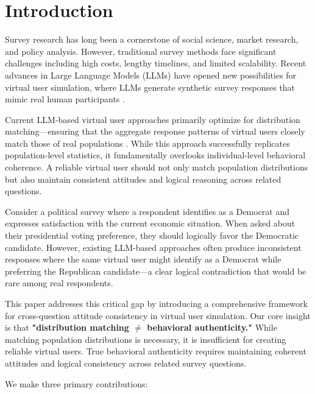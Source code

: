 \documentclass[sigconf, anonymous]{acmart}
\begin{document}
\section{Introduction}

Survey research has long been a cornerstone of social science, market research, and policy analysis. However, traditional survey methods face significant challenges including high costs, lengthy timelines, and limited scalability. Recent advances in Large Language Models (LLMs) have opened new possibilities for virtual user simulation, where LLMs generate synthetic survey responses that mimic real human participants \cite{park2023generative, chen2025polypersona, wang2025large}.

Current LLM-based virtual user approaches primarily optimize for distribution matching—ensuring that the aggregate response patterns of virtual users closely match those of real populations \cite{zhang2025llm, liu2025alignsurvey}. While this approach successfully replicates population-level statistics, it fundamentally overlooks individual-level behavioral coherence. A reliable virtual user should not only match population distributions but also maintain consistent attitudes and logical reasoning across related questions.

Consider a political survey where a respondent identifies as a Democrat and expresses satisfaction with the current economic situation. When asked about their presidential voting preference, they should logically favor the Democratic candidate. However, existing LLM-based approaches often produce inconsistent responses where the same virtual user might identify as a Democrat while preferring the Republican candidate—a clear logical contradiction that would be rare among real respondents.

This paper addresses this critical gap by introducing a comprehensive framework for cross-question attitude consistency in virtual user simulation. Our core insight is that \textbf{"distribution matching $\neq$ behavioral authenticity."} While matching population distributions is necessary, it is insufficient for creating reliable virtual users. True behavioral authenticity requires maintaining coherent attitudes and logical consistency across related survey questions.

We make three primary contributions:
\end{document}
